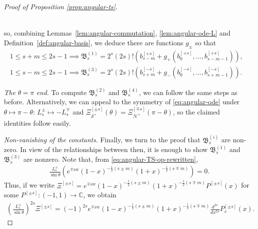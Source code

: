 \documentclass[11pt]{article}
\newcommand{\cN}{\mathcal N}
\newcommand{\cS}{\mathcal S}
\numberwithin{equation}{section}
\begin{document}
\begin{proof}[Proof of Proposition \ref{prop:angular-ts}]
\begin{itemize}
\begin{align*}
\end{align*}
\end{itemize}
so, combining Lemmas~\ref{lem:angular-commutation}, \ref{lem:angular-ode-L} and Definition~\ref{def:angular-basis}, we deduce there are functions $g_\pm$ so that
\begin{gather*}
1\leq s+ m \leq 2s-1\implies \mathfrak B_s^{(1)}= 2^{s}(2s)!\left(b_{s- m}^{[+s]}+g_+(b_0^{[+s]}, \dots, b_{s- m-1}^{[+s]})\right), \\ 1\leq s- m \leq 2s-1 \implies \mathfrak B_s^{(3)}=2^{s}(2s)!\left(b_{s+ m}^{[-s]}+g_-(b_0^{[-s]}, \dots, b_{s+ m-1}^{[-s]})\right).
\end{gather*}

\medskip
\noindent \textit{The $\theta=\pi$ end.} To compute $\mathfrak B_s^{(2)}$ and $\mathfrak B_s^{(4)}$, we can follow the same steps as before. Alternatively, we can  appeal to the symmetry of \eqref{eq:angular-ode} under $\theta\mapsto \pi-\theta$: $L^\pm_s\mapsto -L_s^\mp$  and $\Xi^{[\pm s]}_{\cS^+}(\theta)=\Xi^{[\mp s]}_{\cN^+}(\pi- \theta)$, so the claimed identities follow easily. 

\medskip
\noindent \textit{Non-vanishing of the constants.} Finally, we turn to the proof that $\mathfrak B_s^{(i)}$ are non-zero. In view of the relationships between then, it is enough to show  $\mathfrak B_s^{(1)}$ and $\mathfrak B_s^{(3)}$ are nonzero. Note that, from \eqref{eq:angular-TS-op-rewritten},
\begin{align*}
&\frac{L_s^\pm}{\sin\theta}\left(e^{\mp \nu x}(1-x)^{-\frac12(s\pm m)}(1+x)^{-\frac12(s\mp m)}\right)=0.
\end{align*}
Thus, if we write $\Xi^{[\pm s]} = e^{\mp \nu x}(1-x)^{-\frac12(s\pm m)}(1+x)^{-\frac12(s\mp m)}P^{[\pm s]}(x)$ for some $P^{[\pm s]}\colon (-1,1)\to \mathbb C$, we obtain 
\begin{align*}
\left(\frac{L_s^\pm}{\sin\theta}\right)^{2s}\Xi^{[\pm s]}=(-1)^{2s}e^{\mp \nu x}(1-x)^{-\frac12(s\pm m)}(1+x)^{-\frac12(s\mp m)}\frac{d^{2s}}{dx^{2s}}P_s^{[\pm s]}(x).
\end{align*}


\end{proof}
\end{document}
